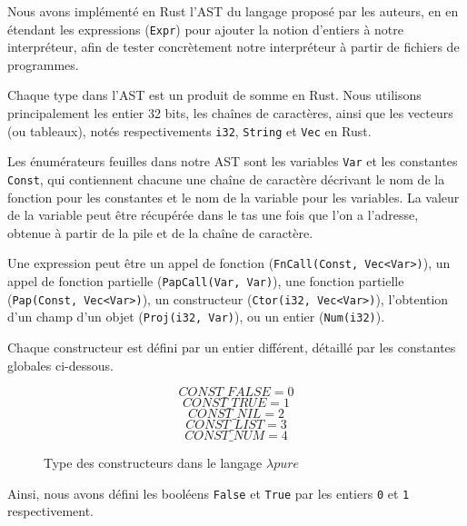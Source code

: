 \documentclass{rapportECL}
\begin{document}
Nous avons implémenté en Rust l'AST du langage proposé par les auteurs, en en étendant les 
expressions (\verb|Expr|) pour ajouter la notion d'entiers à notre interpréteur,
afin de tester concrètement notre interpréteur à partir de fichiers de programmes.

Chaque type dans l'AST est un produit de somme en Rust. Nous utilisons principalement les entier 32 bits, les chaînes de caractères,
ainsi que les vecteurs (ou tableaux), notés respectivements \verb|i32|, \verb|String| et \verb|Vec| en Rust.

\bigskip

Les énumérateurs feuilles dans notre AST sont les variables \verb|Var| et les constantes \verb|Const|,
qui contiennent chacune une chaîne de caractère décrivant le nom de la fonction pour les constantes et 
le nom de la variable pour les variables. La valeur de la variable peut être récupérée dans le tas
une fois que l'on a l'adresse, obtenue à partir de la pile et de la chaîne de caractère.

\medskip

Une expression peut être un appel de fonction (\verb|FnCall(Const, Vec<Var>)|), un appel de fonction partielle (\verb|PapCall(Var, Var)|),
une fonction partielle (\verb|Pap(Const, Vec<Var>)|), un constructeur (\verb|Ctor(i32, Vec<Var>)|), 
l'obtention d'un champ d'un objet (\verb|Proj(i32, Var)|), ou un entier (\verb|Num(i32)|).

\medskip

Chaque constructeur est défini par un entier différent, détaillé par les constantes globales ci-dessous.

\begin{figure}[H]
\begin{equation*}
CONST\_FALSE = 0
\end{equation*}
\begin{equation*}
CONST\_TRUE = 1
\end{equation*}
\begin{equation*}
CONST\_NIL = 2
\end{equation*}
\begin{equation*}
CONST\_LIST = 3
\end{equation*}
\begin{equation*}
CONST\_NUM = 4
\end{equation*}
\caption{Type des constructeurs dans le langage $\lambda{pure}$}
\label{listing:types_ctor}
\end{figure}
\FloatBarrier 
Ainsi, nous avons défini les booléens \verb|False| et \verb|True| par les entiers \verb|0| et \verb|1| respectivement.
\end{document}
